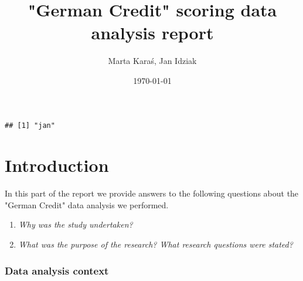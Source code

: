 \documentclass[10pt]{article}\usepackage[]{graphicx}\usepackage[]{color}
\makeatletter
\newenvironment{kframe}{%
 \def\at@end@of@kframe{}%
 \ifinner\ifhmode%
  \def\at@end@of@kframe{\end{minipage}}%
  \begin{minipage}{\columnwidth}%
 \fi\fi%
 \def\FrameCommand##1{\hskip\@totalleftmargin \hskip-\fboxsep
 \colorbox{shadecolor}{##1}\hskip-\fboxsep
     \hskip-\linewidth \hskip-\@totalleftmargin \hskip\columnwidth}%
 \MakeFramed {\advance\hsize-\width
   \@totalleftmargin\z@ \linewidth\hsize
   \@setminipage}}%
 {\par\unskip\endMakeFramed%
 \at@end@of@kframe}
\newenvironment{knitrout}{}{} %
\makeatother
\begin{document}
\title{"German Credit" scoring data analysis report}
\author{Marta Karaś, Jan Idziak}
\date{\today}
\maketitle


\newcommand{\E}{\mathbb{E}}
\newcommand{\Var}{\textnormal{Var}}
\newcommand{\bias}{\textnormal{bias}}
\newcommand{\mse}{\textnormal{MSE}}
\newcommand{\se}{\textnormal{se}}

\def\contentsname{Table of content}
\tableofcontents
\setcounter{tocdepth}{2}

\begin{knitrout}
\color{fgcolor}\begin{kframe}
\begin{verbatim}
## [1] "jan"
\end{verbatim}
\end{kframe}
\end{knitrout}


\clearpage
\part{Introduction}

In this part of the report we provide answers to the following questions about the "German Credit" data analysis we performed. 
\begin{enumerate}
\item \textit{Why was the study undertaken?}
\item \textit{What was the purpose of the research? What research questions were stated?} 
\end{enumerate}



\section{Data analysis context}
\end{document}
